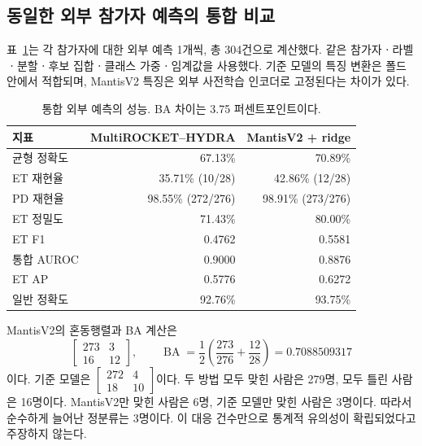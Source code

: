 \documentclass[11pt,a4paper]{article}
\DeclareMathOperator{\BA}{BA}
\numberwithin{equation}{section}
\begin{document}
\subsection{동일한 외부 참가자 예측의 통합 비교}
표~\ref{tab:metrics}는 각 참가자에 대한 외부 예측 1개씩, 총 304건으로 계산했다.
같은 참가자ㆍ라벨ㆍ분할ㆍ후보 집합ㆍ클래스 가중ㆍ임계값을 사용했다.
기준 모델의 특징 변환은 폴드 안에서 적합되며,
MantisV2 특징은 외부 사전학습 인코더로 고정된다는 차이가 있다.
\begin{table}[htbp]\centering\small
\caption{통합 외부 예측의 성능. BA 차이는 3.75 퍼센트포인트이다.}\label{tab:metrics}
\begin{tabular}{@{}lrr@{}}\toprule
지표 & MultiROCKET--HYDRA & MantisV2 + ridge\\\midrule
균형 정확도 & 67.13\% & 70.89\%\\
ET 재현율 & 35.71\% (10/28) & 42.86\% (12/28)\\
PD 재현율 & 98.55\% (272/276) & 98.91\% (273/276)\\
ET 정밀도 & 71.43\% & 80.00\%\\
ET F1 & 0.4762 & 0.5581\\
통합 AUROC & 0.9000 & 0.8876\\
ET AP & 0.5776 & 0.6272\\
일반 정확도 & 92.76\% & 93.75\%\\\bottomrule
\end{tabular}
\end{table}
MantisV2의 혼동행렬과 BA 계산은
\begin{equation}
 \begin{bmatrix}273&3\\16&12\end{bmatrix},\qquad
 \BA=\frac12\left(\frac{273}{276}+\frac{12}{28}\right)
 =0.7088509317
\end{equation}
이다. 기준 모델은 $\left[\begin{smallmatrix}272&4\\18&10\end{smallmatrix}\right]$이다.
두 방법 모두 맞힌 사람은 279명, 모두 틀린 사람은 16명이다.
MantisV2만 맞힌 사람은 6명, 기준 모델만 맞힌 사람은 3명이다.
따라서 순수하게 늘어난 정분류는 3명이다.
이 대응 건수만으로 통계적 유의성이 확립되었다고 주장하지 않는다.
\end{document}
